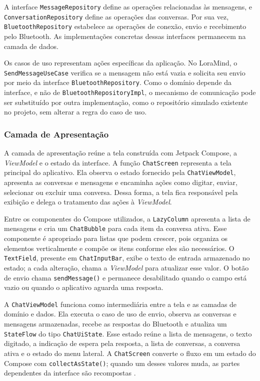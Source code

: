 \documentclass[12pt]{article}
\begin{document}
A interface \texttt{MessageRepository} define as operações relacionadas às mensagens, e \texttt{ConversationRepository} define as operações das conversas. Por sua vez, \texttt{BluetoothRepository} estabelece as operações de conexão, envio e recebimento pelo Bluetooth. As implementações concretas dessas interfaces permanecem na camada de dados.

Os casos de uso representam ações específicas da aplicação. No LoraMind, o \texttt{SendMessageUseCase} verifica se a mensagem não está vazia e solicita seu envio por meio da interface \texttt{BluetoothRepository}. Como o domínio depende da interface, e não de \texttt{BluetoothRepositoryImpl}, o mecanismo de comunicação pode ser substituído por outra implementação, como o repositório simulado existente no projeto, sem alterar a regra do caso de uso.

\subsubsection{Camada de Apresentação}

A camada de apresentação reúne a tela construída com Jetpack Compose, a \textit{ViewModel} e o estado da interface. A função \texttt{ChatScreen} representa a tela principal do aplicativo. Ela observa o estado fornecido pela \texttt{ChatViewModel}, apresenta as conversas e mensagens e encaminha ações como digitar, enviar, selecionar ou excluir uma conversa. Dessa forma, a tela fica responsável pela exibição e delega o tratamento das ações à \textit{ViewModel}.

Entre os componentes do Compose utilizados, a \texttt{LazyColumn} apresenta a lista de mensagens e cria um \texttt{ChatBubble} para cada item da conversa ativa. Esse componente é apropriado para listas que podem crescer, pois organiza os elementos verticalmente e compõe os itens conforme eles são necessários. O \texttt{TextField}, presente em \texttt{ChatInputBar}, exibe o texto de entrada armazenado no estado; a cada alteração, chama a \textit{ViewModel} para atualizar esse valor. O botão de envio chama \texttt{sendMessage()} e permanece desabilitado quando o campo está vazio ou quando o aplicativo aguarda uma resposta.

A \texttt{ChatViewModel} funciona como intermediária entre a tela e as camadas de domínio e dados. Ela executa o caso de uso de envio, observa as conversas e mensagens armazenadas, recebe as respostas do Bluetooth e atualiza um \texttt{StateFlow} do tipo \texttt{ChatUiState}. Esse estado reúne a lista de mensagens, o texto digitado, a indicação de espera pela resposta, a lista de conversas, a conversa ativa e o estado do menu lateral. A \texttt{ChatScreen} converte o fluxo em um estado do Compose com \texttt{collectAsState()}; quando um desses valores muda, as partes dependentes da interface são recompostas \cite{androidcomposestate2026}.
\end{document}
